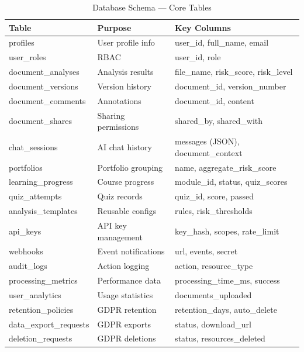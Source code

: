 \documentclass[12pt,a4paper,oneside]{report}
\begin{document}
\begin{table}[htbp]
\centering
\caption{Database Schema --- Core Tables}
\label{tab:dbschema}
\footnotesize
\begin{tabular}{|p{3.5cm}|p{4cm}|p{4.5cm}|}
\hline
\textbf{Table} & \textbf{Purpose} & \textbf{Key Columns} \\
\hline
profiles & User profile info & user\_id, full\_name, email \\ \hline
user\_roles & RBAC & user\_id, role \\ \hline
document\_analyses & Analysis results & file\_name, risk\_score, risk\_level \\ \hline
document\_versions & Version history & document\_id, version\_number \\ \hline
document\_comments & Annotations & document\_id, content \\ \hline
document\_shares & Sharing permissions & shared\_by, shared\_with \\ \hline
chat\_sessions & AI chat history & messages (JSON), document\_context \\ \hline
portfolios & Portfolio grouping & name, aggregate\_risk\_score \\ \hline
learning\_progress & Course progress & module\_id, status, quiz\_scores \\ \hline
quiz\_attempts & Quiz records & quiz\_id, score, passed \\ \hline
analysis\_templates & Reusable configs & rules, risk\_thresholds \\ \hline
api\_keys & API key management & key\_hash, scopes, rate\_limit \\ \hline
webhooks & Event notifications & url, events, secret \\ \hline
audit\_logs & Action logging & action, resource\_type \\ \hline
processing\_metrics & Performance data & processing\_time\_ms, success \\ \hline
user\_analytics & Usage statistics & documents\_uploaded \\ \hline
retention\_policies & GDPR retention & retention\_days, auto\_delete \\ \hline
data\_export\_requests & GDPR exports & status, download\_url \\ \hline
deletion\_requests & GDPR deletions & status, resources\_deleted \\ \hline
\end{tabular}
\end{table}
\end{document}
